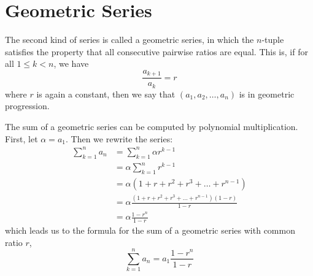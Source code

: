 \documentclass[12pt,a4paper]{report}
\begin{document}
\section{Geometric Series}

The second kind of series is called a geometric series, in which the $n$-tuple
satisfies the property that all consecutive pairwise ratios are equal. This is,
if for all $1 \le k < n$, we have \[ \frac{a_{k+1}}{a_k} = r \] where $r$ is
again a constant, then we say that $(a_1, a_2, \dots, a_n)$ is in geometric
progression.

The sum of a geometric series can be computed by polynomial multiplication.
First, let $\alpha = a_1$. Then we rewrite the series: \begin{align*}
 \sum_{k=1}^n a_n
 &= \sum_{k=1}^n \alpha r^{k-1} \\
 &= \alpha \sum_{k=1}^n r^{k-1} \\
 &= \alpha (1 + r + r^2 + r^3 + \dots + r^{n-1}) \\
 &= \alpha \frac{(1 + r + r^2 + r^3 + \dots + r^{n-1})(1-r)}{1-r} \\
 &= \alpha \frac{1-r^n}{1-r}
\end{align*} which leads us to the formula for the sum of a geometric series
with common ratio $r$,
\begin{equation}
 \sum_{k=1}^n a_n = a_1 \frac{1 - r^n}{1 - r}
\end{equation}
\end{document}

